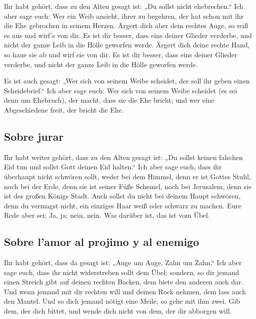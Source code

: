  Ihr habt gehört, dass zu den Alten gesagt ist: „Du
sollst nicht ehebrechen.``  Ich aber sage euch: Wer ein
Weib ansieht, ihrer zu begehren, der hat schon mit ihr die Ehe gebrochen
in seinem Herzen.  Ärgert dich aber dein rechtes Auge, so
reiß es aus und wirf's von dir. Es ist dir besser, dass eins deiner
Glieder verderbe, und nicht der ganze Leib in die Hölle geworfen werde.
 Ärgert dich deine rechte Hand, so haue sie ab und wirf
sie von dir. Es ist dir besser, dass eins deiner Glieder verderbe, und
nicht der ganze Leib in die Hölle geworfen werde.

 Es ist auch gesagt: „Wer sich von seinem Weibe scheidet,
der soll ihr geben einen Scheidebrief.``  Ich aber sage
euch: Wer sich von seinem Weibe scheidet (es sei denn um Ehebruch), der
macht, dass sie die Ehe bricht; und wer eine Abgeschiedene freit, der
bricht die Ehe.

\hypertarget{sobre-jurar}{%
\subsection{Sobre jurar}\label{sobre-jurar}}

 Ihr habt weiter gehört, dass zu den Alten gesagt ist:
„Du sollst keinen falschen Eid tun und sollst Gott deinen Eid halten.``
 Ich aber sage euch, dass ihr überhaupt nicht schwören
sollt, weder bei dem Himmel, denn er ist Gottes Stuhl, 
noch bei der Erde, denn sie ist seiner Füße Schemel, noch bei Jerusalem,
denn sie ist des großen Königs Stadt.  Auch sollst du
nicht bei deinem Haupt schwören, denn du vermagst nicht, ein einziges
Haar weiß oder schwarz zu machen.  Eure Rede aber sei:
Ja, ja; nein, nein. Was darüber ist, das ist vom Übel.

\hypertarget{sobre-lamor-al-projimo-y-al-enemigo}{%
\subsection{Sobre l'amor al projimo y al
enemigo}\label{sobre-lamor-al-projimo-y-al-enemigo}}

 Ihr habt gehört, dass da gesagt ist: „Auge um Auge, Zahn
um Zahn.``  Ich aber sage euch, dass ihr nicht
widerstreben sollt dem Übel; sondern, so dir jemand einen Streich gibt
auf deinen rechten Backen, dem biete den anderen auch dar.
 Und wenn jemand mit dir rechten will und deinen Rock
nehmen, dem lass auch den Mantel.  Und so dich jemand
nötigt eine Meile, so gehe mit ihm zwei.  Gib dem, der
dich bittet, und wende dich nicht von dem, der dir abborgen will.

